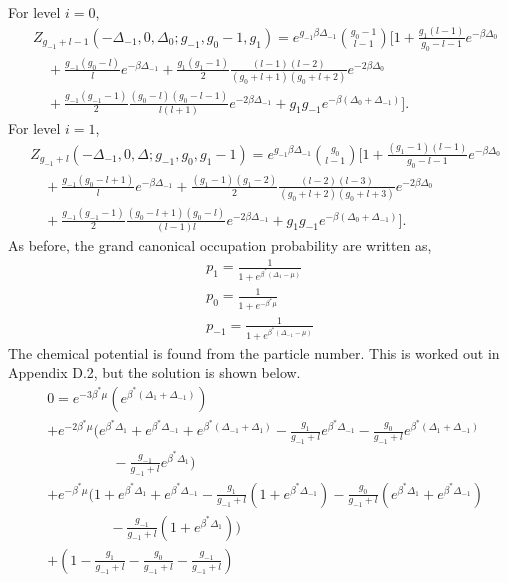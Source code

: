 For level $i=0$,
\begin{align}
    &Z_{g_{-1}+l-1}(-\Delta_{-1},0,\Delta_0;g_{-1},g_0-1,g_1)=e^{g_{-1}\beta\Delta_{-1}} {g_0-1\choose l-1} \Biggr[1+\frac{g_1 (l-1)}{g_0-l-1} e^{-\beta\Delta_0}\nonumber\\
    &\quad+\frac{g_{-1}(g_0-l)}{l} e^{-\beta\Delta_{-1}} +\frac{g_1(g_1-1)}{2} \frac{(l-1)(l-2)}{(g_0+l+1)(g_0+l+2)}e^{-2\beta\Delta_0}\nonumber\\ &\quad+\frac{g_{-1}(g_{-1}-1)}{2} \frac{(g_0-l)(g_0-l-1)}{l(l+1)} e^{-2\beta\Delta_{-1}} +g_1g_{-1}e^{-\beta(\Delta_0+\Delta_{-1})}\Biggr].
\end{align}
For level $i=1$,
\begin{align}
    &Z_{g_{-1}+l}(-\Delta_{-1},0,\Delta;g_{-1},g_0,g_1-1) =e^{g_{-1}\beta\Delta_{-1}} {g_0\choose l-1} \Biggr[1+\frac{(g_1-1) (l-1)}{g_0-l-1} e^{-\beta\Delta_0} \nonumber\\
    &\quad+\frac{g_{-1}(g_0-l+1)}{l} e^{-\beta\Delta_{-1}} +\frac{(g_1-1)(g_1-2)}{2} \frac{(l-2)(l-3)}{(g_0+l+2)(g_0+l+3)}e^{-2\beta\Delta_0}\nonumber\\ &\quad+\frac{g_{-1}(g_{-1}-1)}{2} \frac{(g_0-l+1)(g_0-l)}{(l-1)l} e^{-2\beta\Delta_{-1}} +g_1g_{-1}e^{-\beta(\Delta_0+\Delta_{-1})}\Biggr].
\end{align}
As before, the grand canonical occupation probability are written as,
\begin{gather}
    p_1=\frac{1}{1+e^{\beta^*(\Delta_1-\mu)}}\nonumber\\
    p_0=\frac{1}{1+e^{-\beta^*\mu}}\nonumber\\
    p_{-1}=\frac{1}{1+e^{\beta^*(\Delta_{-1}-\mu)}}\nonumber
\end{gather}
The chemical potential is found from the particle number. This is worked out in Appendix D.2, but the solution is shown below. 
\begin{align}
    &0=e^{-3\beta^*\mu}(e^{\beta^*(\Delta_1+\Delta_{-1})})\nonumber\\
    &+e^{-2\beta^*\mu}\Biggr(e^{\beta^*\Delta_1}+e^{\beta^*\Delta_{-1}}+e^{\beta^*(\Delta_{-1}+\Delta_1)}-\frac{g_1}{g_{-1}+l}e^{\beta^*\Delta_{-1}}\nonumber-\frac{g_0}{g_{-1}+l}e^{\beta^*(\Delta_1+\Delta_{-1})}\nonumber\\
    &\quad\quad\quad\quad\ \ \ -\frac{g_{-1}}{g_{-1}+l}e^{\beta^*\Delta_1}\Biggr)\nonumber\\
    &+e^{-\beta^*\mu}\Biggr(1+e^{\beta^*\Delta_1}+e^{\beta^*\Delta_{-1}}-\frac{g_1}{g_{-1}+l}(1+e^{\beta^*\Delta_{-1}})-\frac{g_0}{g_{-1}+l}(e^{\beta^*\Delta_1}+e^{\beta^*\Delta_{-1}})\nonumber\\
    &\quad\quad\quad\quad\ \ -\frac{g_{-1}}{g_{-1}+l}(1+e^{\beta^*\Delta_1})\Biggr)\nonumber\\
    & +(1-\frac{g_1}{g_{-1}+l}-\frac{g_0}{g_{-1}+l}-\frac{g_{-1}}{g_{-1}+l})
\end{align}
